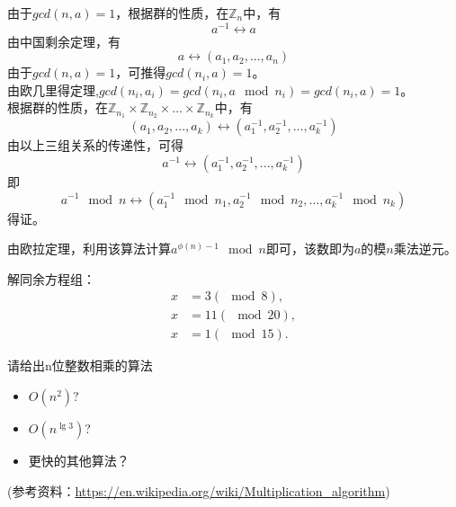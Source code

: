 \documentclass[a4paper, justified]{tufte-handout}
\begin{document}
\begin{problem}[TC 31.5-3]
\end{problem}

\begin{solution}
由于$gcd(n,a)=1$，根据群的性质，在$\mathbb{Z}_n$中，有
\[
a^{-1}\leftrightarrow a
\]
由中国剩余定理，有
\[
a\leftrightarrow (a_1,a_2,...,a_n)
\]
由于$gcd(n,a)=1$，可推得$gcd(n_i,a)=1$。\\
由欧几里得定理,$gcd(n_i, a_i)=gcd(n_i, a \mod n_i)=gcd(n_i,a)=1$。\\
根据群的性质，在$\mathbb{Z}_{n_1}\times \mathbb{Z}_{n_2}\times...\times\mathbb{Z}_{n_k}$中，有
\[
(a_1,a_2,...,a_k)\leftrightarrow (a_1^{-1},a_2^{-1},...,a_k^{-1})
\]
由以上三组关系的传递性，可得
\[
a^{-1}\leftrightarrow (a_1^{-1},a_2^{-1},...,a_k^{-1})
\]
即
\[
a^{-1}\mod n\leftrightarrow (a_1^{-1}\mod n_1,a_2^{-1}\mod n_2,...,a_k^{-1}\mod n_k)
\]
得证。
\end{solution}

\begin{problem}[TC 31.6-3]
\end{problem}

\begin{solution}
由欧拉定理，利用该算法计算$a^{\phi(n)-1}\mod n$即可，该数即为$a$的模$n$乘法逆元。
\end{solution}

\beginoptional

\begin{problem}[同余方程组]
解同余方程组：
$$\begin{array}{ll}
	x &= 3 (\mod 8),\\
	x &= 11 (\mod 20),\\
	x &=1 (\mod 15). 
\end{array}
$$
\end{problem}

\begin{solution}
\end{solution}


\beginot
\begin{ot}[乘法算法]	
	请给出n位整数相乘的算法
	\begin{itemize}
	\item $O(n^2)$?
	\item $O(n^{\lg 3})$?
	\item 更快的其他算法？
	\end{itemize}	
	(参考资料：\href{https://en.wikipedia.org/wiki/Multiplication_algorithm}{https://en.wikipedia.org/wiki/Multiplication\_algorithm})
\end{ot}
\end{document}
